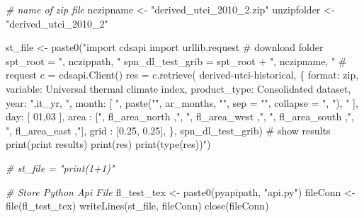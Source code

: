 \documentclass[
]{book}
\newenvironment{Shaded}{\begin{snugshade}}{\end{snugshade}}
\newcommand{\AttributeTok}[1]{\textcolor[rgb]{0.77,0.63,0.00}{#1}}
\newcommand{\CommentTok}[1]{\textcolor[rgb]{0.56,0.35,0.01}{\textit{#1}}}
\newcommand{\FunctionTok}[1]{\textcolor[rgb]{0.00,0.00,0.00}{#1}}
\newcommand{\NormalTok}[1]{#1}
\newcommand{\OtherTok}[1]{\textcolor[rgb]{0.56,0.35,0.01}{#1}}
\newcommand{\StringTok}[1]{\textcolor[rgb]{0.31,0.60,0.02}{#1}}
\begin{document}
\begin{Shaded}
\begin{Highlighting}[]
    \CommentTok{\# name of zip file}
\NormalTok{    nczipname }\OtherTok{\textless{}{-}} \StringTok{"derived\_utci\_2010\_2.zip"}
\NormalTok{    unzipfolder }\OtherTok{\textless{}{-}} \StringTok{"derived\_utci\_2010\_2"}

\NormalTok{    st\_file }\OtherTok{\textless{}{-}} \FunctionTok{paste0}\NormalTok{(}\StringTok{"import cdsapi}
\StringTok{import urllib.request}
\StringTok{\# download folder}
\StringTok{spt\_root = \textquotesingle{}"}\NormalTok{, nczippath, }\StringTok{"\textquotesingle{}}
\StringTok{spn\_dl\_test\_grib = spt\_root + \textquotesingle{}"}\NormalTok{, nczipname, }\StringTok{"\textquotesingle{}}
\StringTok{\# request}
\StringTok{c = cdsapi.Client()}
\StringTok{res = c.retrieve(}
\StringTok{    \textquotesingle{}derived{-}utci{-}historical\textquotesingle{},}
\StringTok{    \{}
\StringTok{        \textquotesingle{}format\textquotesingle{}: \textquotesingle{}zip\textquotesingle{},}
\StringTok{        \textquotesingle{}variable\textquotesingle{}: \textquotesingle{}Universal thermal climate index\textquotesingle{},}
\StringTok{        \textquotesingle{}product\_type\textquotesingle{}: \textquotesingle{}Consolidated dataset\textquotesingle{},}
\StringTok{        \textquotesingle{}year\textquotesingle{}: \textquotesingle{}"}\NormalTok{,it\_yr, }\StringTok{"\textquotesingle{},}
\StringTok{        \textquotesingle{}month\textquotesingle{}: [}
\StringTok{            "}\NormalTok{, }\FunctionTok{paste}\NormalTok{(}\StringTok{"\textquotesingle{}"}\NormalTok{, ar\_months, }\StringTok{"\textquotesingle{}"}\NormalTok{, }\AttributeTok{sep =} \StringTok{""}\NormalTok{, }\AttributeTok{collapse =} \StringTok{", "}\NormalTok{), }\StringTok{"}
\StringTok{        ],}
\StringTok{        \textquotesingle{}day\textquotesingle{}: [}
\StringTok{            \textquotesingle{}01\textquotesingle{},\textquotesingle{}03\textquotesingle{}}
\StringTok{        ],}
\StringTok{        \textquotesingle{}area\textquotesingle{}  : ["}\NormalTok{, fl\_area\_north ,}\StringTok{", "}\NormalTok{, fl\_area\_west ,}\StringTok{", "}\NormalTok{, fl\_area\_south ,}\StringTok{", "}\NormalTok{, fl\_area\_east ,}\StringTok{"],}
\StringTok{        \textquotesingle{}grid\textquotesingle{}  : [0.25, 0.25],}
\StringTok{    \},}
\StringTok{    spn\_dl\_test\_grib)}
\StringTok{\# show results}
\StringTok{print(\textquotesingle{}print results\textquotesingle{})}
\StringTok{print(res)}
\StringTok{print(type(res))"}\NormalTok{)}

    \CommentTok{\# st\_file = "print(1+1)"}

    \CommentTok{\# Store Python Api File}
\NormalTok{    fl\_test\_tex }\OtherTok{\textless{}{-}} \FunctionTok{paste0}\NormalTok{(pyapipath, }\StringTok{"api.py"}\NormalTok{)}
\NormalTok{    fileConn }\OtherTok{\textless{}{-}} \FunctionTok{file}\NormalTok{(fl\_test\_tex)}
    \FunctionTok{writeLines}\NormalTok{(st\_file, fileConn)}
    \FunctionTok{close}\NormalTok{(fileConn)}


\end{Highlighting}
\end{Shaded}
\end{document}

